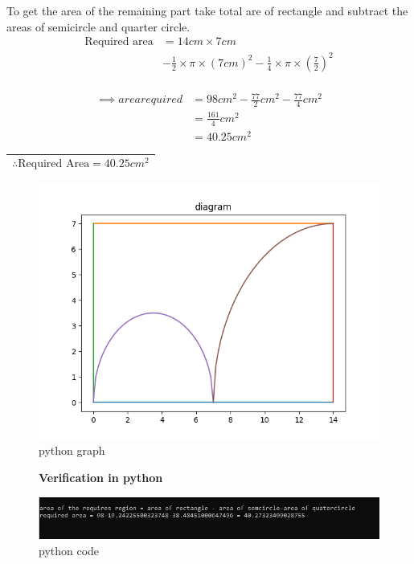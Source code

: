 \documentclass[journal,12pt,twocolumn]{IEEEtran}
\newcommand{\rectarea}[2]{#1 \times #2}
\newcommand{\semicirarea}[1]{\frac{1}{2} \times \pi \times (#1)^2}
\newcommand{\quatercirarea}[1]{\frac{1}{4} \times \pi \times (#1)^2}
\begin{document}
To get the area of the remaining part take total are of rectangle
and subtract the areas of semicircle and quarter circle.
\begin{align*}
    \text{Required area} &= \rectarea{14cm}{7cm} \\
                     &- \semicirarea{7cm} - \quatercirarea{\frac{7}{2}} \\
\end{align*}

   
\begin{align}
\implies area required &=98cm^{2} - \frac{77}{2}cm^{2} - \frac{77}{4}cm^{2} \nonumber \\ 
&= \frac{161}{4}cm^{2} \nonumber \\
&= 40.25cm^{2} 
    \end{align}

\begin{center}
\renewcommand{\arraystretch}{1.1}
\begin{tabular}{|c|}
\hline
    $$ \therefore \text{Required Area} = 40.25cm^2 $$ &\\
\hline
\end{tabular}
\end{center}

\begin{figure}
    \centering
    \includegraphics[scale = 0.6]{Figure_2.png}
    \caption{python graph}
    \label{fig:my_pythondiagram}
\end{figure}

\begin{figure}
\begin{center}
\textbf{Verification in python}
\end{center}
    \centering
    \includegraphics[scale = 0.75]{Figure_3.jpg}
    \caption{python code}
    \label{fig:my_codeverification}
\end{figure}
\end{document}
